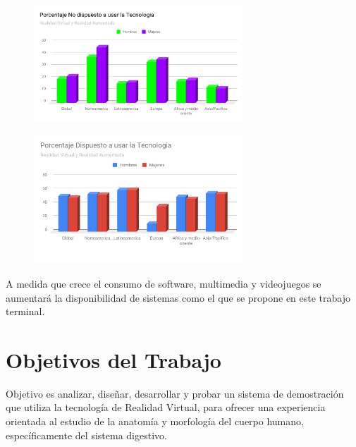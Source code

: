\documentclass[11pt]{report}
\begin{document}
\begin{figure}[H]
	\begin{center}
 		\includegraphics[width = 0.7\textwidth]{source/images/image2.png}
	\end{center} 
\end{figure}

\begin{figure}[H]
	\begin{center}
 		\includegraphics[width = 0.7\textwidth]{source/images/image10.png}
	\end{center} 
\end{figure}

A medida que crece el consumo de software, multimedia y videojuegos se aumentará la disponibilidad de sistemas como el que se propone en este trabajo terminal.
\\

\section{Objetivos del Trabajo}
Objetivo es analizar, diseñar, desarrollar y probar un sistema de demostración que utiliza la tecnología de Realidad Virtual, para ofrecer una experiencia orientada al estudio de la anatomía y morfología del cuerpo humano, específicamente del sistema digestivo.
\newline
\end{document}
